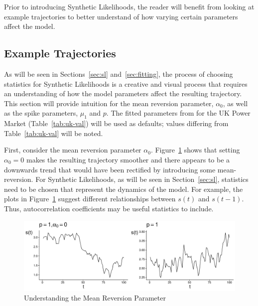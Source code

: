 Prior to introducing Synthetic Likelihoods, the reader will benefit from looking at example trajectories to better understand of how varying certain parameters affect the model.

\subsection{Example Trajectories}

As will be seen in Sections~\ref{sec:sl} and~\ref{sec:fitting}, the process of choosing statistics for Synthetic Likelihoods is a creative and visual process that requires an understanding of how the model parameters affect the resulting trajectory. This section will provide intuition for the mean reversion parameter, $\alpha_0$, as well as the spike parameters, $\mu_1$ and $p$. The fitted parameters from \cite{huisman_mahieu_2003} for the UK Power Market (Table~\ref{tab:uk-val}) will be used as defaults; values differing from Table~\ref{tab:uk-val} will be noted.

\begin{table}[H]
\caption{Fitted Parameter Values for UK
\label{tab:uk-val}
Telerate Market \citep{huisman_mahieu_2003}}
\end{table}

First, consider the mean reversion parameter $\alpha_0$. Figure~\ref{fig:mr_param} shows that setting $\alpha_0 = 0$ makes the resulting trajectory smoother and there appears to be a downwards trend that would have been rectified by introducing some mean-reversion. For Synthetic Likelihoods, as will be seen in Section~\ref{sec:sl}, statistics need to be chosen that represent the dynamics of the model. For example, the plots in Figure~\ref{fig:mr_param} suggest different relationships between $s(t)$ and $s(t-1)$. Thus, autocorrelation coefficients may be useful statistics to include.

\begin{figure}[H]
    \centering
    \includegraphics[width=12cm]{images/model/mean_reversion_example.pdf}
    \caption{Understanding the Mean Reversion Parameter}
    \label{fig:mr_param}
\end{figure}

